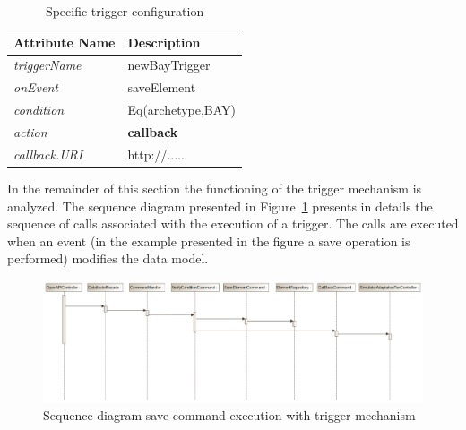 \begin{table}[h]
\begin{tabular}{@{}l|l@{}}
\toprule
\textbf{Attribute Name} & \textbf{Description} \\ \midrule
 \textit{triggerName}   & newBayTrigger             \\
 \textit{onEvent}       & saveElement            \\
 \textit{condition}     & Eq(archetype,BAY)            \\ 
 \textit{action}        & \textbf{callback}         
 \\ 
\textit{callback.URI}   & http://.....            \\ 
\bottomrule
\end{tabular}%
\caption{Specific trigger configuration}
\label{tb:triggerEx}
\end{table}



In the remainder of this section the functioning of the trigger mechanism is analyzed. The sequence diagram presented in Figure~\ref{fig:triggerSequence2} presents in details the sequence of calls associated with the execution of a trigger. The calls are executed when an event (in the example presented in the figure a save operation is performed) modifies the data model. 

\begin{figure}
\includegraphics[width=\textheight]{images/trigger2.png}
  \caption{Sequence diagram save command execution with trigger mechanism}
  \label{fig:triggerSequence2}
\end{figure}

